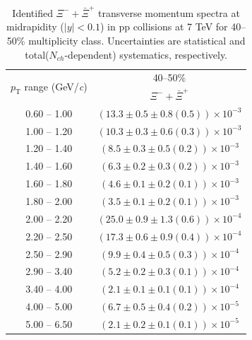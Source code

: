 \begin{table}
\caption{Identified $\Xi^{-} + \bar{\Xi}^{+}$ transverse momentum spectra at midrapidity ($|y|<0.1$) in pp collisions at 7 TeV for 40--50\% multiplicity class. Uncertainties are statistical and total($N_{ch}$-dependent) systematics, respectively.}
\label{tab:XiSum_40to50}
\begin{center}
\begin{tabular}{ c | c }
\hline
\multirow{2}{*}{$p_{\mathrm{T}}$ range (GeV/\textit{c})} & \multicolumn{1}{c}{40--50\%} \\ & $\Xi^{-} + \bar{\Xi}^{+}$\\ 
\hline
0.60 -- 1.00 & $(13.3\pm0.5\pm0.8(0.5))\times10^{-3}$ \\ 
1.00 -- 1.20 & $(10.3\pm0.3\pm0.6(0.3))\times10^{-3}$ \\ 
1.20 -- 1.40 & $(8.5\pm0.3\pm0.5(0.2))\times10^{-3}$ \\ 
1.40 -- 1.60 & $(6.3\pm0.2\pm0.3(0.2))\times10^{-3}$ \\ 
1.60 -- 1.80 & $(4.6\pm0.1\pm0.2(0.1))\times10^{-3}$ \\ 
1.80 -- 2.00 & $(3.5\pm0.1\pm0.2(0.1))\times10^{-3}$ \\ 
2.00 -- 2.20 & $(25.0\pm0.9\pm1.3(0.6))\times10^{-4}$ \\ 
2.20 -- 2.50 & $(17.3\pm0.6\pm0.9(0.4))\times10^{-4}$ \\ 
2.50 -- 2.90 & $(9.9\pm0.4\pm0.5(0.3))\times10^{-4}$ \\ 
2.90 -- 3.40 & $(5.2\pm0.2\pm0.3(0.1))\times10^{-4}$ \\ 
3.40 -- 4.00 & $(2.1\pm0.1\pm0.1(0.1))\times10^{-4}$ \\ 
4.00 -- 5.00 & $(6.7\pm0.5\pm0.4(0.2))\times10^{-5}$ \\ 
5.00 -- 6.50 & $(2.1\pm0.2\pm0.1(0.1))\times10^{-5}$ \\ 
\hline
\end{tabular}
\end{center}
\end{table}
 
